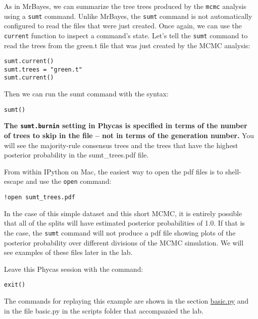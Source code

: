 \documentclass{article}
\newcommand{\cmd}[1]{\texttt{#1}\xspace}
\newcommand{\mb}{MrBayes\xspace}
\newcommand{\phycas}{Phycas\xspace}
\newcommand{\localfile}[1]{\textsf{#1}\xspace}
\begin{document}
As in \mb, we can summarize the tree trees produced by the \cmd{mcmc} analysis
using a \cmd{sumt} command.
Unlike \mb, the \cmd{sumt} command is not automatically configured to read the files
that were just created.
Once again, we can use the \cmd{current} function to inspect a command's state.
Let's tell the \cmd{sumt} command to read the trees from the \localfile{green.t} file
that was just created by the MCMC analysis:
\begin{verbatim}
sumt.current()
sumt.trees = "green.t"
sumt.current()
\end{verbatim}

Then we can run the sumt command with the syntax:
\begin{verbatim}
sumt()
\end{verbatim}
\textbf{The \cmd{sumt.burnin} setting in \phycas is specified in terms of the number of trees to skip in the file -- not in terms of the generation number.}
You will see the majority-rule consensus trees and the trees that have the 
highest posterior probability in the \localfile{sumt\_trees.pdf} file.

From within IPython on Mac, the easiest way to open the pdf files is to shell-escape and use the \cmd{open} command:
\begin{verbatim}
!open sumt_trees.pdf
\end{verbatim}


In the case of this simple dataset and this short MCMC, it is entirely possible that all of the 
splits will have estimated posterior probabilities of 1.0.
If that is the case, the \cmd{sumt} command will not produce a pdf file showing 
plots of the posterior probability over different divisions of the MCMC
simulation.
We will see examples of these files later in the lab.

Leave this \phycas session with the command:
\begin{verbatim}
exit()
\end{verbatim}
The commands for replaying this example are shown in the section \hyperref[basicpy]{basic.py} and in the file \localfile{basic.py} in the scripts folder that accompanied the lab.

\end{document}
